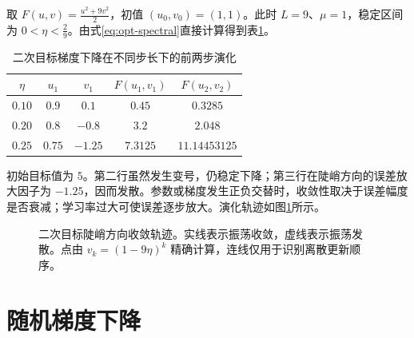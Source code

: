 \documentclass[../textbook.tex]{subfiles}
\begin{document}
\begin{example}[学习率与下降、振荡、发散]
取 $F(u,v)=\frac{u^2+9v^2}{2}$，初值 $(u_0,v_0)=(1,1)$。此时 $L=9$、$\mu=1$，稳定区间为 $0<\eta<\frac{2}{9}$。由式\eqref{eq:opt-spectral}直接计算得到表\ref{tab:opt-quadratic-steps}。
\begin{table}[htbp]
\centering
\caption{二次目标梯度下降在不同步长下的前两步演化}
\label{tab:opt-quadratic-steps}
\begin{tabular}{ccccc}
\toprule
$\eta$ & $u_1$ & $v_1$ & $F(u_1,v_1)$ & $F(u_2,v_2)$\\\midrule
$0.10$ & $0.9$ & $0.1$ & $0.45$ & $0.3285$\\
$0.20$ & $0.8$ & $-0.8$ & $3.2$ & $2.048$\\
$0.25$ & $0.75$ & $-1.25$ & $7.3125$ & $11.14453125$\\
\bottomrule
\end{tabular}
\end{table}
初始目标值为 $5$。第二行虽然发生变号，仍稳定下降；第三行在陡峭方向的误差放大因子为 $-1.25$，因而发散。参数或梯度发生正负交替时，收敛性取决于误差幅度是否衰减；学习率过大可使误差逐步放大。演化轨迹如图\ref{fig:opt-stable-unstable}所示。

\begin{figure}[htbp]
\centering
{}
\caption[二次目标陡峭方向收敛轨迹]{二次目标陡峭方向收敛轨迹。实线表示振荡收敛，虚线表示振荡发散。点由 $v_k=(1-9\eta)^k$ 精确计算，连线仅用于识别离散更新顺序。}\label{fig:opt-stable-unstable}
\end{figure}
\end{example}

\section{随机梯度下降}
\end{document}
